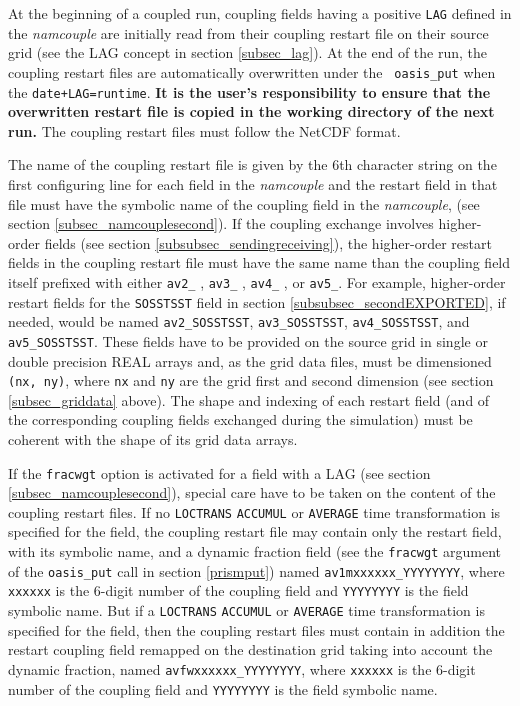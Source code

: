 At the beginning of a coupled run, coupling fields having a positive {\tt LAG} defined in the {\it namcouple} are
initially read from their coupling restart file on their source grid (see the LAG concept in section \ref{subsec_lag}). 
At the end of the run, the coupling restart files are automatically overwritten under the {\tt
    oasis\_put} when the {\tt date+LAG=runtime}. {\bf It is the user's responsibility to ensure that the overwritten restart file is copied in the working directory of the next run.} The
coupling restart files must follow the NetCDF format.


The name of the coupling restart file is given by the 6th character
string on the first configuring line for each field in the {\it
  namcouple} and the restart field in that file must have the symbolic name of the coupling field in the {\it
  namcouple}, (see section \ref{subsec_namcouplesecond}). If the coupling exchange involves higher-order fields (see section \ref{subsubsec_sendingreceiving}), the higher-order restart fields in the coupling restart file must have the same name than the coupling field itself prefixed with either {\tt av2\_} , {\tt av3\_} , {\tt av4\_} , or {\tt av5\_}. For example, higher-order restart fields for the {\tt SOSSTSST} field in section \ref{subsubsec_secondEXPORTED}, if needed, would be named {\tt av2\_SOSSTSST}, {\tt av3\_SOSSTSST}, {\tt av4\_SOSSTSST}, and {\tt av5\_SOSSTSST}. These fields have to be provided on the
source grid in single or double precision REAL arrays and, as the grid data files, must be dimensioned {\tt (nx, ny)}, where {\tt nx} and
{\tt ny} are the grid first and second dimension (see section \ref{subsec_griddata} above).  The shape and indexing of each
restart field (and of the corresponding coupling fields exchanged during the simulation) must be coherent with the shape of its grid
data arrays.

If the {\tt fracwgt} option is activated for a field with a LAG (see section \ref{subsec_namcouplesecond}), special care have to be taken on the content of the coupling restart files. If no {\tt LOCTRANS} {\tt ACCUMUL} or {\tt AVERAGE} time transformation is specified for the field, the coupling restart file may contain only the restart field, with its symbolic name, and a dynamic fraction field (see the {\tt fracwgt} argument of the {\tt oasis\_put} call in section \ref{prismput}) named {\tt av1mxxxxxx\_YYYYYYYY}, where {\tt xxxxxx} is the 6-digit number of the coupling field and {\tt YYYYYYYY} is the field symbolic name. But if a {\tt LOCTRANS} {\tt ACCUMUL} or {\tt AVERAGE} time transformation is specified for the field, then the coupling restart files must contain in addition the restart coupling field remapped on the destination grid taking into account the dynamic fraction, named {\tt avfwxxxxxx\_YYYYYYYY}, where {\tt xxxxxx} is the 6-digit number of the coupling field and {\tt YYYYYYYY} is the field symbolic name.

